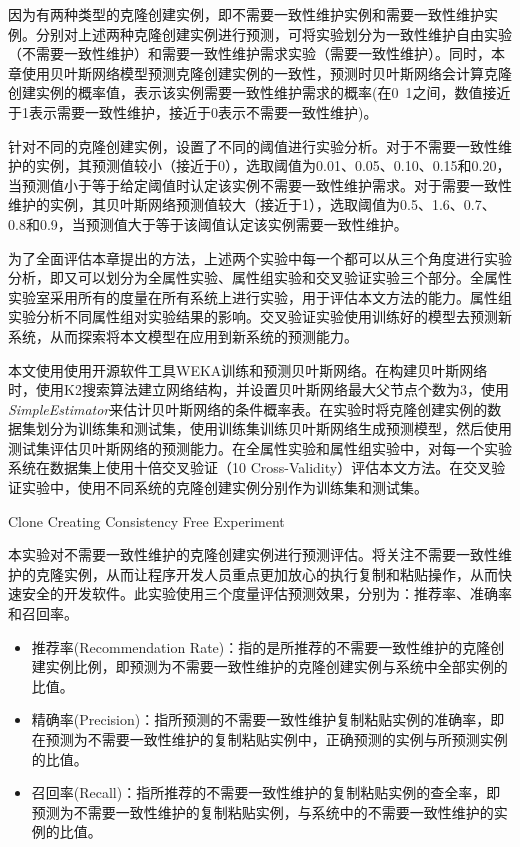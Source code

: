 因为有两种类型的克隆创建实例，即不需要一致性维护实例和需要一致性维护实例。分别对上述两种克隆创建实例进行预测，可将实验划分为一致性维护自由实验（不需要一致性维护）和需要一致性维护需求实验（需要一致性维护）。同时，本章使用贝叶斯网络模型预测克隆创建实例的一致性，预测时贝叶斯网络会计算克隆创建实例的概率值，表示该实例需要一致性维护需求的概率(在0~1之间，数值接近于1表示需要一致性维护，接近于0表示不需要一致性维护)。

针对不同的克隆创建实例，设置了不同的阈值进行实验分析。对于不需要一致性维护的实例，其预测值较小（接近于0），选取阈值为0.01、0.05、0.10、0.15和0.20，当预测值小于等于给定阈值时认定该实例不需要一致性维护需求。对于需要一致性维护的实例，其贝叶斯网络预测值较大（接近于1），选取阈值为0.5、1.6、0.7、0.8和0.9，当预测值大于等于该阈值认定该实例需要一致性维护。

为了全面评估本章提出的方法，上述两个实验中每一个都可以从三个角度进行实验分析，即又可以划分为全属性实验、属性组实验和交叉验证实验三个部分。全属性实验室采用所有的度量在所有系统上进行实验，用于评估本文方法的能力。属性组实验分析不同属性组对实验结果的影响。交叉验证实验使用训练好的模型去预测新系统，从而探索将本文模型在应用到新系统的预测能力。

本文使用使用开源软件工具WEKA训练和预测贝叶斯网络。在构建贝叶斯网络时，使用K2搜索算法\cite{}建立网络结构，并设置贝叶斯网络最大父节点个数为3，使用{\em  SimpleEstimator}来估计贝叶斯网络的条件概率表。在实验时将克隆创建实例的数据集划分为训练集和测试集，使用训练集训练贝叶斯网络生成预测模型，然后使用测试集评估贝叶斯网络的预测能力。在全属性实验和属性组实验中，对每一个实验系统在数据集上使用十倍交叉验证（10 Cross-Validity\cite{}）评估本文方法。在交叉验证实验中，使用不同系统的克隆创建实例分别作为训练集和测试集。

{Clone Creating Consistency Free Experiment}

本实验对不需要一致性维护的克隆创建实例进行预测评估。将关注不需要一致性维护的克隆实例，从而让程序开发人员重点更加放心的执行复制和粘贴操作，从而快速安全的开发软件。此实验使用三个度量评估预测效果，分别为：推荐率、准确率和召回率。
\begin{itemize}
\item	
推荐率(Recommendation Rate)：指的是所推荐的不需要一致性维护的克隆创建实例比例，即预测为不需要一致性维护的克隆创建实例与系统中全部实例的比值。
\item  
精确率(Precision)：指所预测的不需要一致性维护复制粘贴实例的准确率，即在预测为不需要一致性维护的复制粘贴实例中，正确预测的实例与所预测实例的比值。
\item  
召回率(Recall)：指所推荐的不需要一致性维护的复制粘贴实例的查全率，即预测为不需要一致性维护的复制粘贴实例，与系统中的不需要一致性维护的实例的比值。
\end{itemize}

